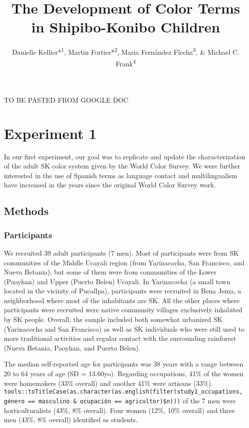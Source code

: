 \documentclass[floatsintext,man]{apa6}
\title{The Development of Color Terms in Shipibo-Konibo Children}
\author{Danielle Kellier*\textsuperscript{1}, Martin Fortier*\textsuperscript{2}, Maria Fernández Flecha\textsuperscript{3}, \& Michael C. Frank\textsuperscript{4}}
\affiliation{
    \vspace{0.5cm}
          \textsuperscript{1} University of Pennsylvania\\
          \textsuperscript{2} PSL Research University\\
          \textsuperscript{2} Pontificia Universidad Católica del Perú\\
          \textsuperscript{2} Stanford University  }
\theoremstyle{definition}
\theoremstyle{definition}
\theoremstyle{definition}
\theoremstyle{remark}
\begin{document}
\maketitle

\setcounter{secnumdepth}{0}



TO BE PASTED FROM GOOGLE DOC

\section{Experiment 1}\label{experiment-1}

In our first experiment, our goal was to replicate and update the
characterization of the adult SK color system given by the World Color
Survey. We were further interested in the use of Spanish terms as
language contact and multilingualism have increased in the years since
the original World Color Survey work.

\subsection{Methods}\label{methods}

\subsubsection{Participants}\label{participants}

We recruited 39 adult participants (7 men). Most of participants were
from SK communities of the Middle Ucayali region (from Yarinacocha, San
Francisco, and Nueva Betania), but some of them were from communities of
the Lower (Paoyhan) and Upper (Puerto Belen) Ucayali. In Yarinacocha (a
small town located in the vicinity of Pucallpa), participants were
recruited in Bena Jema, a neighborhood where most of the inhabitants are
SK. All the other places where participants were recruited were native
community villages exclusively inhabited by SK people. Overall, the
sample included both somewhat urbanized SK (Yarinacocha and San
Francisco) as well as SK individuals who were still used to more
traditional activities and regular contact with the surrounding
rainforest (Nueva Betania, Paoyhan, and Puerto Belen).

The median self-reported age for participants was 38 years with a range
between 20 to 64 years of age (SD = 13.60yo). Regarding occupations,
41\% of the women were homemakers (33\% overall) and another 41\% were
artisans (33\%).
\texttt{tools::toTitleCase(as.character(as.english(filter(study1\_occupations,\ género\ ==\ \textquotesingle{}masculino\textquotesingle{}\ \&\ ocupación\ ==\ \textquotesingle{}agricultor\textquotesingle{})\$n)))}
of the 7 men were horticulturalists (43\%, 8\% overall). Four women
(12\%, 10\% overall) and three men (43\%, 8\% overall) identified as
students.
\end{document}
